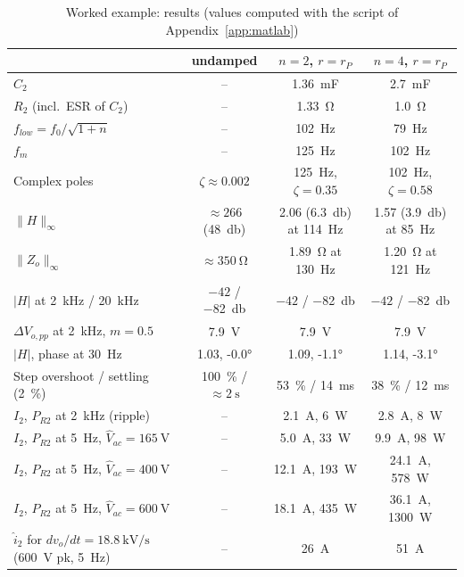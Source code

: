 \documentclass[11pt,a4paper]{article}
\begin{document}
\begin{table}[htb]
\centering
\small
\caption{Worked example: results (values computed with the script of Appendix~\ref{app:matlab})}
\footnotesize
\begin{tabular}{@{}lccc@{}}
\toprule
 & undamped & $n = 2$, $r = r_P$ & $n = 4$, $r = r_P$ \\
\midrule
$C_2$ & -- & \SI{1.36}{\milli\farad} & \SI{2.7}{\milli\farad} \\
$R_2$ (incl.\ ESR of $C_2$) & -- & \SI{1.33}{\ohm} & \SI{1.0}{\ohm} \\
$f_{low} = f_0/\sqrt{1+n}$ & -- & \SI{102}{\hertz} & \SI{79}{\hertz} \\
$f_m$ & -- & \SI{125}{\hertz} & \SI{102}{\hertz} \\
Complex poles & $\zeta \approx 0.002$ & \SI{125}{\hertz}, $\zeta = 0.35$ & \SI{102}{\hertz}, $\zeta = 0.58$ \\
$\|H\|_\infty$ & $\approx 266$ (\SI{48}{\decibel}) & 2.06 (\SI{6.3}{\decibel}) at \SI{114}{\hertz} & 1.57 (\SI{3.9}{\decibel}) at \SI{85}{\hertz} \\
$\|Z_o\|_\infty$ & $\approx \SI{350}{\ohm}$ & \SI{1.89}{\ohm} at \SI{130}{\hertz} & \SI{1.20}{\ohm} at \SI{121}{\hertz} \\
$|H|$ at \SI{2}{\kilo\hertz} / \SI{20}{\kilo\hertz} & $-42$ / \SI{-82}{\decibel} & $-42$ / \SI{-82}{\decibel} & $-42$ / \SI{-82}{\decibel} \\
$\Delta V_{o,pp}$ at \SI{2}{\kilo\hertz}, $m = 0.5$ & \SI{7.9}{\volt} & \SI{7.9}{\volt} & \SI{7.9}{\volt} \\
$|H|$, phase at \SI{30}{\hertz} & 1.03, \ang{-0.0} & 1.09, \ang{-1.1} & 1.14, \ang{-3.1} \\
Step overshoot / settling (\SI{2}{\percent}) & \SI{100}{\percent} / $\approx\SI{2}{\second}$ & \SI{53}{\percent} / \SI{14}{\milli\second} & \SI{38}{\percent} / \SI{12}{\milli\second} \\
$I_2$, $P_{R2}$ at \SI{2}{\kilo\hertz} (ripple) & -- & \SI{2.1}{\ampere}, \SI{6}{\watt} & \SI{2.8}{\ampere}, \SI{8}{\watt} \\
$I_2$, $P_{R2}$ at \SI{5}{\hertz}, $\hat V_{ac} = \SI{165}{\volt}$ & -- & \SI{5.0}{\ampere}, \SI{33}{\watt} & \SI{9.9}{\ampere}, \SI{98}{\watt} \\
$I_2$, $P_{R2}$ at \SI{5}{\hertz}, $\hat V_{ac} = \SI{400}{\volt}$ & -- & \SI{12.1}{\ampere}, \SI{193}{\watt} & \SI{24.1}{\ampere}, \SI{578}{\watt} \\
$I_2$, $P_{R2}$ at \SI{5}{\hertz}, $\hat V_{ac} = \SI{600}{\volt}$ & -- & \SI{18.1}{\ampere}, \SI{435}{\watt} & \SI{36.1}{\ampere}, \SI{1300}{\watt} \\
$\hat i_2$ for $dv_o/dt = \SI{18.8}{\kilo\volt\per\second}$ (\SI{600}{\volt} pk, \SI{5}{\hertz}) & -- & \SI{26}{\ampere} & \SI{51}{\ampere} \\
\bottomrule
\end{tabular}
\label{tab:example}
\end{table}
\end{document}
